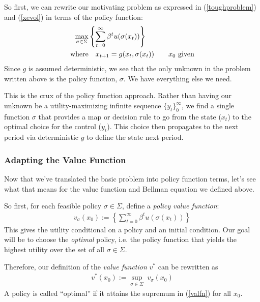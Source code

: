 \documentclass[a4paper,12pt]{scrartcl}
\begin{document}
So first, we can rewrite our motivating problem as
expressed in (\ref{toughproblem}) and (\ref{xevol}) in
terms of the policy function:
\begin{align}
  \label{policyapproach}
  \max_{\sigma \in \Sigma} 
  &\left\{ \sum^\infty_{t=0} \beta^t u(\sigma(x_t)) \right\}\\
  \text{where} &\quad
  x_{t+1} = g(x_t, \sigma(x_t)) 
  \qquad \text{$x_0$ given}
  \notag
\end{align}
Since $g$ is assumed deterministic, we see that the only
unknown in the problem written above is the policy
function, $\sigma$. We have everything else we need.

This is the crux of the policy function approach.
Rather than having our unknown be a utility-maximizing
infinite sequence $\{y_t\}^\infty_0$, we find a single
function $\sigma$ that provides a map or decision rule to
go from the state ($x_t$) to the optimal choice for the
control ($y_t$).  This choice then propagates to the next
period via deterministic $g$ to define the state next
period.

\subsubsection{Adapting the Value Function}

Now that we've translated the basic problem into policy
function terms, let's see what that means for the value
function and Bellman equation we defined above.

So first, for each feasible policy $\sigma\in
\Sigma$, define a \emph{policy value
function}:
\begin{align*}
  v_\sigma(x_0) :=
  \left\{ \sum^\infty_{t=0} \beta^t u(\sigma(x_t)) \right\}
\end{align*}
This gives the utility conditional on a policy and an initial condition.
Our goal will be to choose the \emph{optimal} policy, i.e. the policy
function that yields the highest utility over the set of all $\sigma \in
\Sigma$.

Therefore, our definition of the \emph{value function} $v^*$ can
be rewritten as
\begin{align}
  \label{valfn}
  v^*(x_0) := \sup_{\sigma\in\Sigma} \; v_\sigma(x_0)
\end{align}
A policy is called ``optimal'' if it attains the supremum in
(\ref{valfn}) for all $x_0$. 

\subsubsection{}
\end{document}
